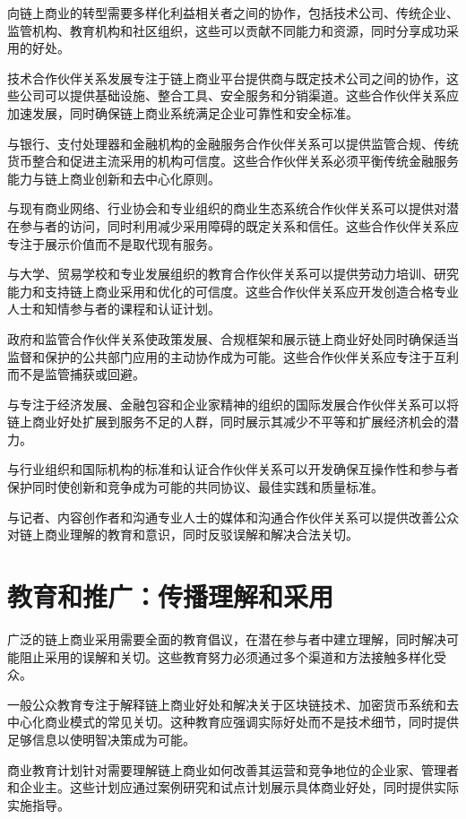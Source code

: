 \documentclass[
  Letterpaper,
]{scrbook}
\begin{document}
向链上商业的转型需要多样化利益相关者之间的协作，包括技术公司、传统企业、监管机构、教育机构和社区组织，这些可以贡献不同能力和资源，同时分享成功采用的好处。

技术合作伙伴关系发展专注于链上商业平台提供商与既定技术公司之间的协作，这些公司可以提供基础设施、整合工具、安全服务和分销渠道。这些合作伙伴关系应加速发展，同时确保链上商业系统满足企业可靠性和安全标准。

与银行、支付处理器和金融机构的金融服务合作伙伴关系可以提供监管合规、传统货币整合和促进主流采用的机构可信度。这些合作伙伴关系必须平衡传统金融服务能力与链上商业创新和去中心化原则。

与现有商业网络、行业协会和专业组织的商业生态系统合作伙伴关系可以提供对潜在参与者的访问，同时利用减少采用障碍的既定关系和信任。这些合作伙伴关系应专注于展示价值而不是取代现有服务。

与大学、贸易学校和专业发展组织的教育合作伙伴关系可以提供劳动力培训、研究能力和支持链上商业采用和优化的可信度。这些合作伙伴关系应开发创造合格专业人士和知情参与者的课程和认证计划。

政府和监管合作伙伴关系使政策发展、合规框架和展示链上商业好处同时确保适当监督和保护的公共部门应用的主动协作成为可能。这些合作伙伴关系应专注于互利而不是监管捕获或回避。

与专注于经济发展、金融包容和企业家精神的组织的国际发展合作伙伴关系可以将链上商业好处扩展到服务不足的人群，同时展示其减少不平等和扩展经济机会的潜力。

与行业组织和国际机构的标准和认证合作伙伴关系可以开发确保互操作性和参与者保护同时使创新和竞争成为可能的共同协议、最佳实践和质量标准。

与记者、内容创作者和沟通专业人士的媒体和沟通合作伙伴关系可以提供改善公众对链上商业理解的教育和意识，同时反驳误解和解决合法关切。

\section{教育和推广：传播理解和采用}\label{ux6559ux80b2ux548cux63a8ux5e7fux4f20ux64adux7406ux89e3ux548cux91c7ux7528}

广泛的链上商业采用需要全面的教育倡议，在潜在参与者中建立理解，同时解决可能阻止采用的误解和关切。这些教育努力必须通过多个渠道和方法接触多样化受众。

一般公众教育专注于解释链上商业好处和解决关于区块链技术、加密货币系统和去中心化商业模式的常见关切。这种教育应强调实际好处而不是技术细节，同时提供足够信息以使明智决策成为可能。

商业教育计划针对需要理解链上商业如何改善其运营和竞争地位的企业家、管理者和企业主。这些计划应通过案例研究和试点计划展示具体商业好处，同时提供实际实施指导。
\end{document}
